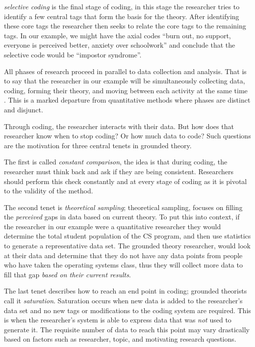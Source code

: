 \documentclass[sigconf]{acmart}
\begin{document}
\emph{selective coding} is the final stage of coding, in this stage the
researcher tries to identify a few central tags that form the basis for the
theory. After identifying these core tags the researcher then seeks to relate
the core tags to the remaining tags. In our example, we might have
the axial codes ``burn out, no support, everyone is perceived better, anxiety
over schoolwork'' and conclude that the selective code would be
``impostor syndrome''.
 
All phases of research proceed in parallel to data collection and analysis. That
is to say that the researcher in our example will be simultaneously collecting
data, coding, forming their theory, and moving between each activity at the
same time . This is a marked departure from quantitative methods where phases
are distinct and disjunct\cite{Strauss67discoveryof}.


Through coding, the researcher interacts with their data. But how does that
researcher know when to stop coding? Or how much data to code? Such questions
are the motivation for three central tenets in grounded theory.
 
The first is called \emph{constant comparison}, the idea is that during coding,
the researcher must think back and ask if they are being consistent. Researchers
should perform this check constantly and at every stage of coding as it is
pivotal to the validity of the method\cite{Strauss67discoveryof}.
 
The second tenet is \emph{theoretical sampling}; theoretical sampling, focuses
on filling the \emph{perceived} gaps in data based on current theory. To put
this into context, if the researcher in our example were a quantitative
researcher they would determine the total student population of the CS program,
and then use statistics to generate a representative data set. The grounded
theory researcher, would look at their data and determine that they do not have
any data points from people who have taken the operating systems class, thus
they will collect more data to fill that gap \emph{based on their current
  results}.
 
The last tenet describes how to reach an end point in coding; grounded theorists
call it \emph{saturation}. Saturation occurs when new data is added to the
researcher's data set and no new tags or modifications to the coding system are
required. This is when the researcher's system is able to express data that was
\emph{not} used to generate it. The requisite number of data to reach this point
may vary drastically based on factors such as researcher, topic, and motivating
research questions.
\end{document}
